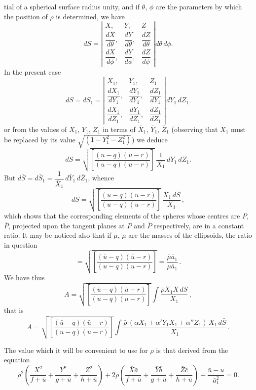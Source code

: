 \documentclass[11pt]{article}
\begin{document}
\smallskip

\noindent tial of a spherical surface radius unity, and if $\theta$, $\phi$ are the parameters by which the position of $\rho$ is determined, we have
\[
dS = \left| \begin{array}{ccc} X, & Y, & Z \\ \dfrac{dX}{d\theta}, & \dfrac{dY}{d\theta}, & \dfrac{dZ}{d\theta} \\ \dfrac{dX}{d\phi}, & \dfrac{dY}{d\phi}, & \dfrac{dZ}{d\phi} \end{array} \right| d\theta\, d\phi.
\]
In the present case
\[
dS = dS_{1} = \left| \begin{array}{ccc} X_{1}, & Y_{1}, & Z_{1} \\ \dfrac{dX_{1}}{dY_{1}}, & \dfrac{dY_{1}}{dY_{1}}, & \dfrac{dZ_{1}}{dY_{1}} \\ \dfrac{dX_{1}}{dZ_{1}}, & \dfrac{dY_{1}}{dZ_{1}}, & \dfrac{dZ_{1}}{dZ_{1}} \end{array} \right| dY_{1}\, dZ_{1}.
\]
or from the values of $X_{1}$, $Y_{1}$, $Z_{1}$ in terms of $\bar{X}_{1}$, $\bar{Y}_{1}$, $\bar{Z}_{1}$ (observing that $X_{1}$ must be replaced by its value $\sqrt{(1 - Y_{1}^{2} - Z_{1}^{2})}$) we deduce
\[
dS = \sqrt{\!\left[\frac{(\bar{u} - q)(\bar{u} - r)}{(u - q)(u - r)}\right]}\,\frac{1}{X_{1}}\, d\bar{Y}_{1}\, d\bar{Z}_{1}.
\]
But $d\bar{S} = d\bar{S}_{1} = \dfrac{1}{\bar{X}_{1}}\, d\bar{Y}_{1}\, d\bar{Z}_{1}$, whence
\[
dS = \sqrt{\!\left[\frac{(\bar{u} - q)(\bar{u} - r)}{(u - q)(u - r)}\right]}\,\frac{\bar{X}_{1}\, d\bar{S}}{X_{1}}\,,
\]
which shows that the corresponding elements of the spheres whose centres are $P$, $\bar{P}$, projected upon the tangent planes at $P$ and $\bar{P}$ respectively, are in a constant ratio. It may be noticed also that if $\mu$, $\bar{\mu}$ are the masses of the ellipsoids, the ratio in question
\[
= \sqrt{\!\left[\frac{(\bar{u} - q)(\bar{u} - r)}{(u - q)(u - r)}\right]} = \frac{\bar{\mu} \bar{a}_{1}}{\mu \bar{a}_{1}}\,.
\]
We have thus
\[
A = \sqrt{\!\left[\frac{(\bar{u} - q)(\bar{u} - r)}{(u - q)(u - r)}\right]} \int \frac{\bar{\rho}\bar{X}_{1} X\, d\bar{S}}{X_{1}}\,,
\]
that is
\[
A = \sqrt{\!\left[\frac{(\bar{u} - q)(\bar{u} - r)}{(u - q)(u - r)}\right]} \int \frac{\bar{\rho}\,(\alpha X_{1} + \alpha' Y_{1} X_{1} + \alpha'' Z_{1})\, X_{1}\, d\bar{S}}{X_{1}}\,.
\]

The value which it will be convenient to use for $\rho$ is that derived from the equation
\[
\bar{\rho}^{2}\!\left(\frac{X^{2}}{f + \bar{u}} + \frac{Y^{2}}{g + \bar{u}} + \frac{Z^{2}}{h + \bar{u}}\right) + 2 \bar{\rho}\!\left(\frac{\bar{X}\bar{a}}{f + \bar{u}} + \frac{\bar{Y}\bar{b}}{g + \bar{u}} + \frac{\bar{Z}\bar{c}}{h + \bar{u}}\right) + \frac{\bar{u} - u}{\bar{a}_{1}^{2}} = 0.
\]
\end{document}
